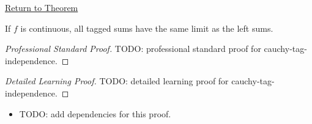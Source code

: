 \newpage
{}
\label{prf:cauchy-tag-independence}
\begin{remark*}[Return]\hyperref[thm:cauchy-tag-independence]{Return to Theorem}\end{remark*}

\begin{theorem*}
If \(f\) is continuous, all tagged sums have the same limit as the left sums.
\end{theorem*}

\begin{proof}[Professional Standard Proof]
\LRAProofBodyStart
TODO: professional standard proof for cauchy-tag-independence.
\end{proof}

\begin{proof}[Detailed Learning Proof]
\LRAProofBodyStart
TODO: detailed learning proof for cauchy-tag-independence.
\end{proof}

\begin{remark*}
\end{remark*}

\begin{dependencies}
\begin{itemize}
  \item TODO: add dependencies for this proof.
\end{itemize}
\end{dependencies}

\clearpage
